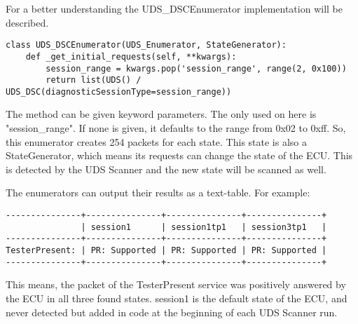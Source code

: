 For a better understanding the UDS\_DSCEnumerator implementation will be described.

\begin{samepage}
\begin{verbatim}
class UDS_DSCEnumerator(UDS_Enumerator, StateGenerator):
    def _get_initial_requests(self, **kwargs):
        session_range = kwargs.pop('session_range', range(2, 0x100))
        return list(UDS() / UDS_DSC(diagnosticSessionType=session_range))
\end{verbatim}
\end{samepage}

The method can be given keyword parameters. The only used on here is "session\_range". If none is given, it defaults to the range from 0x02 to 0xff. So, this enumerator creates 254 packets for each state. This state is also a StateGenerator, which means its requests can change the state of the ECU. This is detected by the UDS Scanner and the new state will be scanned as well.


The enumerators can output their results as a text-table. For example:

\begin{samepage}
\begin{verbatim}
---------------+---------------+---------------+---------------+
               | session1      | session1tp1   | session3tp1   | 
---------------+---------------+---------------+---------------+
TesterPresent: | PR: Supported | PR: Supported | PR: Supported | 
---------------+---------------+---------------+---------------+
\end{verbatim}
\end{samepage}

This means, the packet of the TesterPresent service was positively answered by the ECU in all three found states. session1 is the default state of the ECU, and never detected but added in code at the beginning of each UDS Scanner run.
